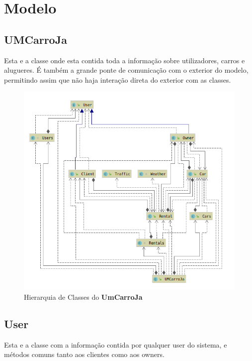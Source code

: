 \documentclass[a4paper]{report}
\begin{document}
\section{Modelo}

\subsection{UMCarroJa}

Esta e a classe onde esta contida toda a informação sobre utilizadores,
carros e alugueres. É também a grande ponte de comunicação com o exterior
do modelo, permitindo assim que não haja interação direta do exterior com
as classes.

\begin{figure}[h]
    \centering
    \includegraphics[scale=0.5]{hierarquiaUmCarroJa.png}
    \caption{Hierarquia de Classes do \textbf{UmCarroJa}}
\end{figure}


\subsection{User}

Esta e a classe com a informação contida por qualquer user do sistema,
e métodos comuns tanto aos clientes como aos owners.
\end{document}

